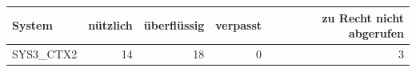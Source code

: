 \begin{tabular}{lrrrr}
\toprule
System & nützlich & überflüssig & verpasst & zu Recht nicht abgerufen \\
\midrule
SYS3\_CTX2 & 14 & 18 & 0 & 3 \\
\bottomrule
\end{tabular}
